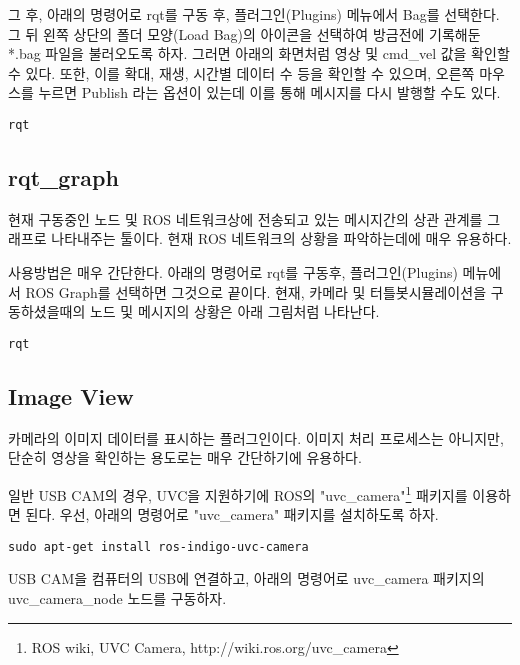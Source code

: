 그 후, 아래의 명령어로 rqt를 구동 후, 플러그인(Plugins) 메뉴에서 Bag를 선택한다. 그 뒤 왼쪽 상단의 폴더 모양(Load Bag)의 아이콘을 선택하여 방금전에 기록해둔 *.bag 파일을 불러오도록 하자. 그러면 아래의 화면처럼 영상 및 cmd\_vel 값을 확인할 수 있다. 또한, 이를 확대, 재생, 시간별 데이터 수 등을 확인할 수 있으며, 오른쪽 마우스를 누르면 Publish 라는 옵션이 있는데 이를 통해 메시지를 다시 발행할 수도 있다.

\begin{lstlisting}[language=ros]
rqt
\end{lstlisting}

\subsection{rqt\_graph}

현재 구동중인 노드 및 ROS 네트워크상에 전송되고 있는 메시지간의 상관 관계를 그래프로 나타내주는 툴이다. 현재 ROS 네트워크의 상황을 파악하는데에 매우 유용하다.

사용방법은 매우 간단한다. 아래의 명령어로 rqt를 구동후, 플러그인(Plugins) 메뉴에서 ROS Graph를 선택하면 그것으로 끝이다. 현재, 카메라 및 터틀봇시뮬레이션을 구동하셨을때의 노드 및 메시지의 상황은 아래 그림처럼 나타난다.

\begin{lstlisting}[language=ros]
rqt
\end{lstlisting}

\subsection{Image View}

카메라의 이미지 데이터를 표시하는 플러그인이다. 이미지 처리 프로세스는 아니지만, 단순히 영상을 확인하는 용도로는 매우 간단하기에 유용하다.

일반 USB CAM의 경우, UVC을 지원하기에 ROS의 "uvc\_camera"\footnote{ROS wiki, UVC Camera, http://wiki.ros.org/uvc\_camera} 패키지를 이용하면 된다. 우선, 아래의 명령어로 "uvc\_camera" 패키지를 설치하도록 하자.

\begin{lstlisting}[language=ros]
sudo apt-get install ros-indigo-uvc-camera 
\end{lstlisting}

USB CAM을 컴퓨터의 USB에 연결하고, 아래의 명령어로 uvc\_camera 패키지의 uvc\_camera\_node 노드를 구동하자.

